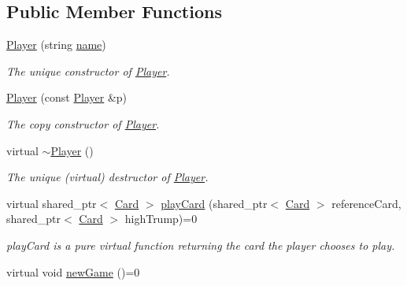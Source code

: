 \subsection*{\-Public \-Member \-Functions}
\begin{DoxyCompactItemize}
\item 
\hyperlink{classPlayer_a05402e93b2be9cb0bcda742a68f27b47}{\-Player} (string \hyperlink{classPlayer_acf0355128a99ee20ad9931b760fb2de1}{name})
\begin{DoxyCompactList}\small\item\em \-The unique constructor of \hyperlink{classPlayer}{\-Player}. \end{DoxyCompactList}\item 
\hypertarget{classPlayer_adf2e45581d8fd61e26328fa48d13b9b7}{\hyperlink{classPlayer_adf2e45581d8fd61e26328fa48d13b9b7}{\-Player} (const \hyperlink{classPlayer}{\-Player} \&p)}\label{classPlayer_adf2e45581d8fd61e26328fa48d13b9b7}

\begin{DoxyCompactList}\small\item\em \-The copy constructor of \hyperlink{classPlayer}{\-Player}. \end{DoxyCompactList}\item 
\hypertarget{classPlayer_a749d2c00e1fe0f5c2746f7505a58c062}{virtual \hyperlink{classPlayer_a749d2c00e1fe0f5c2746f7505a58c062}{$\sim$\-Player} ()}\label{classPlayer_a749d2c00e1fe0f5c2746f7505a58c062}

\begin{DoxyCompactList}\small\item\em \-The unique (virtual) destructor of \hyperlink{classPlayer}{\-Player}. \end{DoxyCompactList}\item 
virtual shared\-\_\-ptr$<$ \hyperlink{classCard}{\-Card} $>$ \hyperlink{classPlayer_aeba090a124bfd9a3666d2d793439cae0}{play\-Card} (shared\-\_\-ptr$<$ \hyperlink{classCard}{\-Card} $>$ reference\-Card, shared\-\_\-ptr$<$ \hyperlink{classCard}{\-Card} $>$ high\-Trump)=0
\begin{DoxyCompactList}\small\item\em play\-Card is a pure virtual function returning the card the player chooses to play. \end{DoxyCompactList}\item 
\hypertarget{classPlayer_a76a707ceb6f24b0a2a801434ee5a60ad}{virtual void \hyperlink{classPlayer_a76a707ceb6f24b0a2a801434ee5a60ad}{new\-Game} ()=0}\label{classPlayer_a76a707ceb6f24b0a2a801434ee5a60ad}


\end{DoxyCompactItemize}
